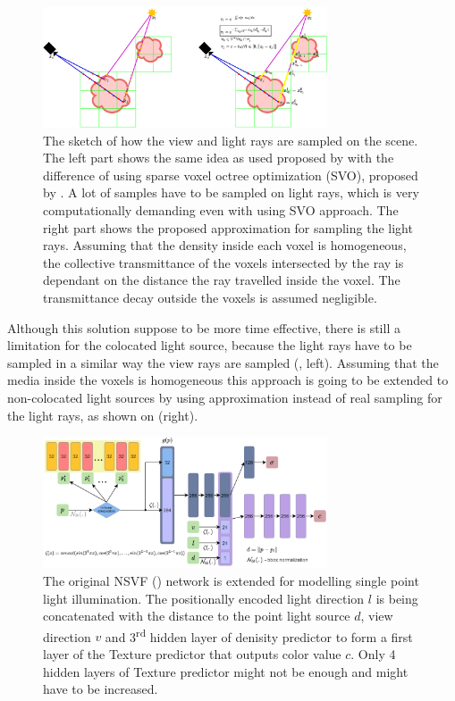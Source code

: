 \documentclass[english]{article}
\begin{document}
\begin{figure}[h]
    \centering
    \includegraphics[width=0.75\textwidth]{img/light_nrf_approx_both.png}
    \caption{The sketch of how the view and light rays are sampled on the scene. The left part shows the same idea as used proposed by \cite{nrf2020} with the difference of using sparse voxel octree optimization (SVO), proposed by \cite{nsvf2020}. A lot of samples have to be sampled on light rays, which is very computationally demanding even with using SVO approach. The right part shows the proposed approximation for sampling the light rays. Assuming that the density inside each voxel is homogeneous, the collective transmittance of the voxels intersected by the ray is dependant on the distance the ray travelled inside the voxel. The transmittance decay outside the voxels is assumed negligible.}
    \label{fig:light_nrf_approx_both}
\end{figure}

Although this solution suppose to be more time effective, there is still a limitation for the colocated light source, because the light rays have to be sampled in a similar way the view rays are sampled (, left). Assuming that the media inside the voxels is homogeneous this approach is going to be extended to non-colocated light sources by using approximation instead of real sampling for the light rays, as shown on  (right).


\begin{figure}[h]
    \centering
    \includegraphics[width=0.75\textwidth]{img/mlp_nsvfnrf_implicit.png}
    \caption{The original NSVF (\cite{nsvf2020}) network is extended for modelling single point light illumination. The positionally encoded light direction $l$ is being concatenated with the distance to the point light source $d$, view direction $v$ and 3\textsuperscript{rd} hidden layer of denisity predictor to form a first layer of the Texture predictor that outputs color value $c$. Only 4 hidden layers of Texture predictor might not be enough and might have to be increased.}
    \label{fig:mlp_nsvfnrf_implicit}
\end{figure}
\end{document}
